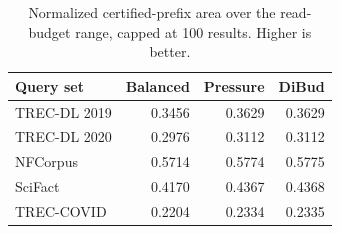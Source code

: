 \begin{table}[t]
\centering
\caption{Normalized certified-prefix area over the read-budget range, capped at 100 results. Higher is better.}
\label{tab:static}
\begin{tabular}{lrrr}
\toprule
Query set & Balanced & Pressure & DiBud \\
\midrule
TREC-DL 2019 & 0.3456 & 0.3629 & 0.3629 \\
TREC-DL 2020 & 0.2976 & 0.3112 & 0.3112 \\
NFCorpus & 0.5714 & 0.5774 & 0.5775 \\
SciFact & 0.4170 & 0.4367 & 0.4368 \\
TREC-COVID & 0.2204 & 0.2334 & 0.2335 \\
\bottomrule
\end{tabular}
\end{table}
